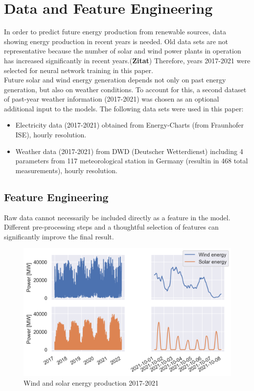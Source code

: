 \documentclass[11pt,table]{article}
\begin{document}
\section{Data and Feature Engineering}
In order to predict future energy production from renewable sources, data showing energy production in recent years is needed. Old data sets are not representative because the number of solar and wind power plants in operation has increased significantly in recent years.(\textbf{Zitat}) Therefore, years 2017-2021 were selected for neural network training in this paper. \\
Future solar and wind energy generation depends not only on past energy generation, but also on weather conditions. To account for this, a second dataset of past-year weather information (2017-2021) was chosen as an optional additional input to the models.
The following data sets were used in this paper:

\begin{itemize}
  \item Electricity data (2017-2021) obtained from Energy-Charts (from Fraunhofer ISE), hourly resolution.
  \item Weather data (2017-2021) from DWD (Deutscher Wetterdienst) including 4 parameters from 117 meteorological station in Germany (resultin in 468 total measurements), hourly resolution.
\end{itemize}%

\subsection{Feature Engineering}
Raw data cannot necessarily be included directly as a feature in the model. Different pre-processing steps and a thoughtful selection of features can significantly improve the final result. 

\begin{figure}[h!]
	\centering
	\includegraphics[scale=0.9]{Figures/electrData.png}
	\caption{Wind and solar energy production 2017-2021}
	\label{fig:electrData}
\end{figure}
\end{document}
